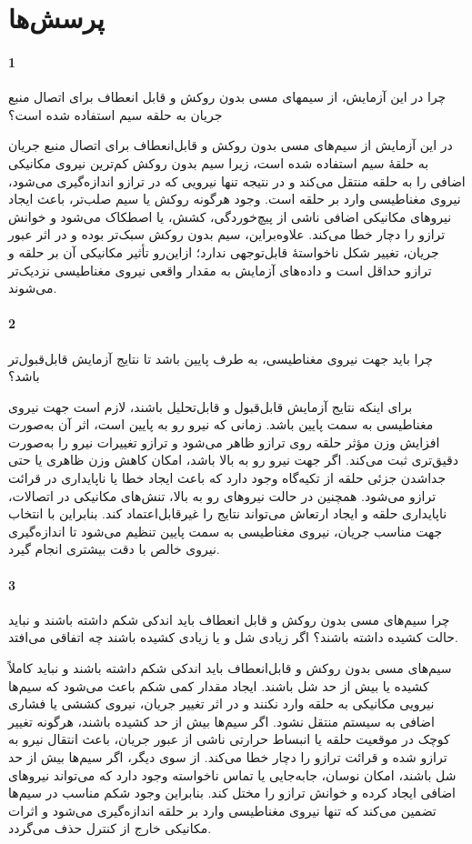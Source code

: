 \documentclass[a4paper, 11pt]{article}
\begin{document}
\section*{پرسش‌ها}


\paragraph{1}
چرا در این آزمایش، از سیمهای مسی بدون روکش و قابل انعطاف برای اتصال منبع جریان به حلقه سیم استفاده شده است؟ 

در این آزمایش از سیم‌های مسی بدون روکش و قابل‌انعطاف برای اتصال منبع جریان به حلقهٔ سیم استفاده شده است، زیرا سیم بدون روکش کم‌ترین نیروی مکانیکی اضافی را به حلقه منتقل می‌کند و در نتیجه تنها نیرویی که در ترازو اندازه‌گیری می‌شود، نیروی مغناطیسی وارد بر حلقه است. وجود هرگونه روکش یا سیم صلب‌تر، باعث ایجاد نیروهای مکانیکی اضافی ناشی از پیچ‌خوردگی، کشش، یا اصطکاک می‌شود و خوانش ترازو را دچار خطا می‌کند. علاوه‌براین، سیم بدون روکش سبک‌تر بوده و در اثر عبور جریان، تغییر شکل ناخواستهٔ قابل‌توجهی ندارد؛ ازاین‌رو تأثیر مکانیکی آن بر حلقه و ترازو حداقل است و داده‌های آزمایش به مقدار واقعی نیروی مغناطیسی نزدیک‌تر می‌شوند.


\paragraph{2}
چرا باید جهت نیروی مغناطیسی، به طرف پایین باشد تا نتایج آزمایش قابل‌قبول‌تر باشد؟ 

برای اینکه نتایج آزمایش قابل‌قبول و قابل‌تحلیل باشند، لازم است جهت نیروی مغناطیسی به سمت پایین باشد. زمانی که نیرو رو به پایین است، اثر آن به‌صورت افزایش وزن مؤثر حلقه روی ترازو ظاهر می‌شود و ترازو تغییرات نیرو را به‌صورت دقیق‌تری ثبت می‌کند. اگر جهت نیرو رو به بالا باشد، امکان کاهش وزن ظاهری یا حتی جداشدن جزئی حلقه از تکیه‌گاه وجود دارد که باعث ایجاد خطا یا ناپایداری در قرائت ترازو می‌شود. همچنین در حالت نیروهای رو به بالا، تنش‌های مکانیکی در اتصالات، ناپایداری حلقه و ایجاد ارتعاش می‌تواند نتایج را غیرقابل‌اعتماد کند. بنابراین با انتخاب جهت مناسب جریان، نیروی مغناطیسی به سمت پایین تنظیم می‌شود تا اندازه‌گیری نیروی خالص با دقت بیشتری انجام گیرد.


\paragraph{3}
چرا سیم‌های مسی بدون روکش و قابل انعطاف باید اندکی شکم داشته باشند و نباید حالت کشیده داشته باشند؟ اگر زیادی شل و یا زیادی کشیده باشند چه اتفاقی می‌افتد. 

سیم‌های مسی بدون روکش و قابل‌انعطاف باید اندکی شکم داشته باشند و نباید کاملاً کشیده یا بیش از حد شل باشند. ایجاد مقدار کمی شکم باعث می‌شود که سیم‌ها نیرویی مکانیکی به حلقه وارد نکنند و در اثر تغییر جریان، نیروی کششی یا فشاری اضافی به سیستم منتقل نشود. اگر سیم‌ها بیش از حد کشیده باشند، هرگونه تغییر کوچک در موقعیت حلقه یا انبساط حرارتی ناشی از عبور جریان، باعث انتقال نیرو به ترازو شده و قرائت ترازو را دچار خطا می‌کند. از سوی دیگر، اگر سیم‌ها بیش از حد شل باشند، امکان نوسان، جابه‌جایی یا تماس ناخواسته وجود دارد که می‌تواند نیروهای اضافی ایجاد کرده و خوانش ترازو را مختل کند. بنابراین وجود شکم مناسب در سیم‌ها تضمین می‌کند که تنها نیروی مغناطیسی وارد بر حلقه اندازه‌گیری می‌شود و اثرات مکانیکی خارج از کنترل حذف می‌گردد.
\end{document}
